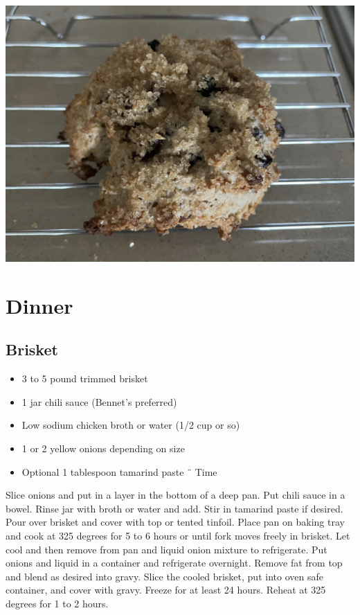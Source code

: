 \documentclass[
  letterpaper,
  DIV=11,
  numbers=noendperiod]{scrreprt}
\providecommand{\tightlist}{%
  \setlength{\itemsep}{0pt}\setlength{\parskip}{0pt}}\usepackage{longtable,booktabs,array}
\begin{document}
\includegraphics{./assets/scone.png}


\hypertarget{dinner}{%
\chapter*{Dinner}\label{dinner}}


\hypertarget{brisket}{%
\section*{Brisket}\label{brisket}}


\begin{itemize}
\tightlist
\item
  3 to 5 pound trimmed brisket
\item
  1 jar chili sauce (Bennet's preferred)
\item
  Low sodium chicken broth or water (1/2 cup or so)
\item
  1 or 2 yellow onions depending on size
\item
  Optional 1 tablespoon tamarind paste ¨ Time
\end{itemize}

Slice onions and put in a layer in the bottom of a deep pan. Put chili
sauce in a bowel. Rinse jar with broth or water and add. Stir in
tamarind paste if desired. Pour over brisket and cover with top or
tented tinfoil. Place pan on baking tray and cook at 325 degrees for 5
to 6 hours or until fork moves freely in brisket. Let cool and then
remove from pan and liquid onion mixture to refrigerate. Put onions and
liquid in a container and refrigerate overnight. Remove fat from top and
blend as desired into gravy. Slice the cooled brisket, put into oven
safe container, and cover with gravy. Freeze for at least 24 hours.
Reheat at 325 degrees for 1 to 2 hours.
\end{document}
